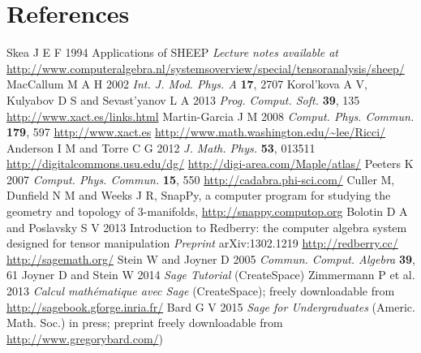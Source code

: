 \documentclass[a4paper]{jpconf}
\begin{document}
\section*{References}
\begin{thebibliography}{10}
Skea J E F 1994 Applications of SHEEP {\it Lecture notes available at}
\url{
http://www.computeralgebra.nl/systemsoverview/special/tensoranalysis/sheep/}
MacCallum M A H 2002 {\it Int. J. Mod. Phys. A} {\bf 17}, 2707 
Korol'kova A V, Kulyabov D S and Sevast'yanov L A 2013 {\it Prog. Comput. Soft.} 
{\bf 39}, 135
\url{http://www.xact.es/links.html}
Martin-Garcia J M 2008 {\it Comput. Phys. Commun.} {\bf 179}, 597
\url{http://www.xact.es}
\url{http://www.math.washington.edu/~lee/Ricci/}
Anderson I M and Torre C G 2012 {\it J. Math. Phys.} {\bf 53}, 013511
\url{http://digitalcommons.usu.edu/dg/}
\url{http://digi-area.com/Maple/atlas/}
Peeters K 2007 {\it Comput. Phys. Commun.} {\bf 15}, 550
\url{http://cadabra.phi-sci.com/}
Culler M, Dunfield N M and Weeks J R, SnapPy, a computer program for studying the geometry and topology of 3-manifolds, \url{http://snappy.computop.org}
Bolotin D A and Poslavsky S V 2013 Introduction to Redberry: the computer algebra system designed for tensor manipulation {\it Preprint} arXiv:1302.1219
\url{http://redberry.cc/}
\url{http://sagemath.org/}
Stein W and Joyner D 2005 {\it Commun. Comput. Algebra} {\bf 39}, 61
Joyner D and Stein W 2014 {\it Sage Tutorial} (CreateSpace)
Zimmermann P et al. 2013 {\it Calcul math\'ematique avec Sage} (CreateSpace); 
freely downloadable from \url{http://sagebook.gforge.inria.fr/}
Bard G V 2015 {\it Sage for Undergraduates} (Americ. Math. Soc.) in press;
preprint freely downloadable from \url{http://www.gregorybard.com/})
\end{thebibliography}
\end{document}
